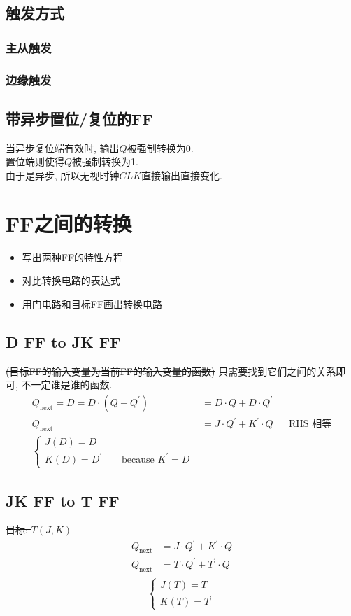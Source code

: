 \documentclass[scheme=chinese,a4paper]{report}
\begin{document}
\subsection{触发方式}
\subsubsection{主从触发}
\subsubsection{边缘触发}
\subsection{带异步置位/复位的FF}
当异步复位端有效时, 输出$Q$被强制转换为0. \\
置位端则使得$Q$被强制转换为1. \\
由于是异步, 所以无视时钟$CLK$直接输出直接变化. 
\section{FF之间的转换}
\begin{itemize}
    \item 写出两种FF的特性方程
    \item 对比转换电路的表达式
    \item 用门电路和目标FF画出转换电路
\end{itemize}
\subsection{D FF to JK FF}
\sout{   (目标FF的输入变量为当前FF的输入变量的函数)} 只需要找到它们之间的关系即可, 不一定谁是谁的函数. 
\begin{align*}
    Q_\text{next}=D=D\cdot (Q+Q ^\prime)&=D\cdot Q+ D \cdot Q ^\prime \\
    Q_\text{next}&=J\cdot Q ^\prime+ K ^\prime \cdot Q &&\text{RHS 相等}\\
    \begin{cases}
        J(D)=D\\
        K(D)=D ^\prime \qquad  \text{because }K ^\prime=D
    \end{cases}
\end{align*}

\subsection{JK FF to T FF}
\sout{目标: $T(J,K)$}
\begin{align*}
    Q_\text{next}&=J\cdot Q ^\prime+ K ^\prime \cdot Q \\
    Q_\text{next}&=T\cdot Q ^\prime+ T ^\prime \cdot Q \\
\end{align*}
$$
\begin{cases}
    J(T)=T\\
    K(T)=T ^\prime
\end{cases}
$$
\end{document}
